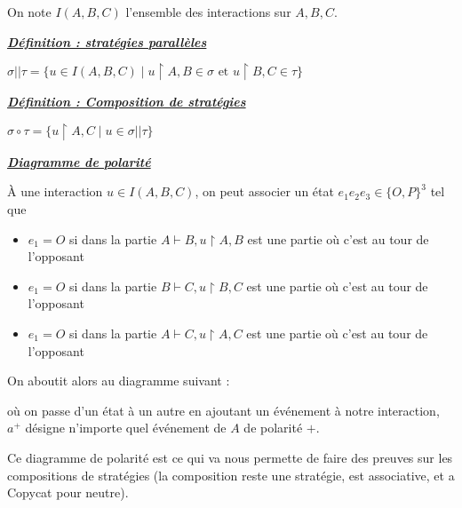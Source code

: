 \documentclass[a4paper,12ptCOUCOU
]{article}
\newlength{\mydepth}
\newlength{\myheight}
\newenvironment{answer}
{\par\begin{lrbox}{\mybox}\quad\begin{minipage}{\linewidth}\color{black}\setlength{\parskip}{10pt plus 1pt minus 1pt}\vspace*{-.7\baselineskip}}
{\end{minipage}\end{lrbox}
\settodepth{\mydepth}{\usebox{\mybox}}
\settoheight{\myheight}{\usebox{\mybox}}
\addtolength{\myheight}{\mydepth}
\noindent\makebox[0pt]{
  \color{gray}\hspace{-0pt}\rule[-\mydepth]{1pt}{\myheight}}
\usebox{\mybox}
  }
\begin{document}
On note $I(A,B,C)$ l'ensemble des interactions sur $A,B,C$.

\vspace{0.4cm}\begin{minipage}{\linewidth}\textbf{\textit{\underline{ Définition : stratégies parallèles }}} \begin{answer}
$\sigma || \tau = \{u \in I(A,B,C) \mid u \upharpoonright A,B \in \sigma \text{ et }u \upharpoonright B,C \in \tau\}$
\end{answer}\end{minipage}

\vspace{0.4cm}\begin{minipage}{\linewidth}\textbf{\textit{\underline{ Définition : Composition de stratégies }}} \begin{answer}
$\sigma \circ \tau = \{u \upharpoonright A,C \mid u \in \sigma || \tau\}$
\end{answer}\end{minipage}

\vspace{0.4cm}\begin{minipage}{\linewidth}\textbf{\textit{\underline{ Diagramme de polarité }}} \begin{answer}

À une interaction $u \in I(A,B,C)$, on peut associer un état
$e_1 e_2 e_3 \in \{O,P\}^3$ tel que
\begin{itemize}
\item $e_1 = O$ si dans la partie $A\vdash B, u\upharpoonright A,B $ est une partie où c'est au tour de l'opposant
\item $e_1 = O$ si dans la partie $B\vdash C, u\upharpoonright B,C $ est une partie où c'est au tour de l'opposant
\item $e_1 = O$ si dans la partie $A\vdash C, u\upharpoonright A,C $ est une partie où c'est au tour de l'opposant
\end{itemize}

On aboutit alors au diagramme suivant :

où on passe d'un état à un autre en ajoutant un événement à notre interaction,
$a^+$ désigne n'importe quel événement de $A$ de polarité $+$.

\end{answer}\end{minipage}

Ce diagramme de polarité est ce qui va nous permette de faire des preuves sur les
compositions de stratégies (la composition reste une stratégie, est associative,
et a Copycat pour neutre).
\end{document}
